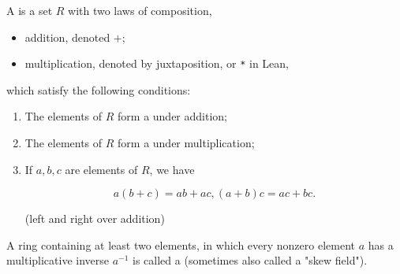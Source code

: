 \begin{definition}[Ring]
    \label{Ring}
    \leanok

    A  is a set $R$ with two laws of composition, 
    
    \begin{itemize}
        
    \item addition, denoted $+$;
    \item multiplication, denoted by juxtaposition, or \texttt{*} in Lean,
    
    \end{itemize}
    
    which satisfy the following conditions:

    \begin{enumerate}
    \item The elements of $R$ form a  under addition;

    \item The elements of $R$ form a  under multiplication;

    \item If $a, b, c$ are elements of $R$, we have

    $$
    a (b + c) = a b + a c, (a + b) c = a c + b c.
    $$

    (left and right  over addition)

    \end{enumerate}

\end{definition}

\begin{definition}
    \label{DivisionRing}
    \leanok

    A ring containing at least two elements, in which
    every nonzero element $a$ has a multiplicative inverse $a^{-1}$ is called a  
    (sometimes also called a "skew field").

\end{definition}




